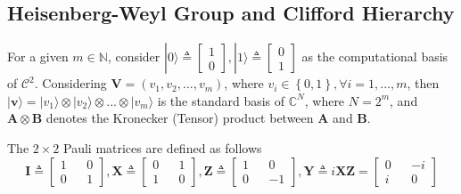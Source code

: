 \documentclass[lettersize,journal,onecolumn]{IEEEtran}
\begin{document}
\subsection{Heisenberg-Weyl Group and Clifford Hierarchy}
For a given $m \in \mathbb{N}$, consider $|0 \rangle \triangleq \begin{bmatrix}
	1 \\ 0 \end{bmatrix}, |1 \rangle \triangleq \begin{bmatrix}
	0 \\ 1 \end{bmatrix}$ as the computational basis of $\mathcal{C}^2$. Considering $\mathbf{V}=\left(v_1, v_2, ..., v_m  \right)$, where $v_i \in\left\{0,1 \right\}, \forall i=1,...,m$, then $|\mathbf{v}\rangle = |v_1\rangle \otimes |v_2\rangle\otimes ... \otimes |v_m \rangle$ is the standard basis of $\mathbb{C}^N$, where $N = 2^m$, and $\mathbf{A}\otimes \mathbf{B}$ denotes the Kronecker (Tensor) product between $\mathbf{A}$ and $\mathbf{B}$. 


 The $2 \times 2$ Pauli matrices are defined as follows
 \begin{equation}
 	\mathbf{I} \triangleq \begin{bmatrix} 1 && 0 \\ 0 && 1 \end{bmatrix}, \mathbf{X} \triangleq \begin{bmatrix} 0 && 1 \\ 1 && 0 \end{bmatrix}, \mathbf{Z} \triangleq \begin{bmatrix} 1 && 0 \\ 0 && -1 \end{bmatrix}, \mathbf{Y} \triangleq i\mathbf{X}\mathbf{Z} = \begin{bmatrix} 0 && -i \\ i && 0 \end{bmatrix}
 \end{equation}
 
\end{document}
